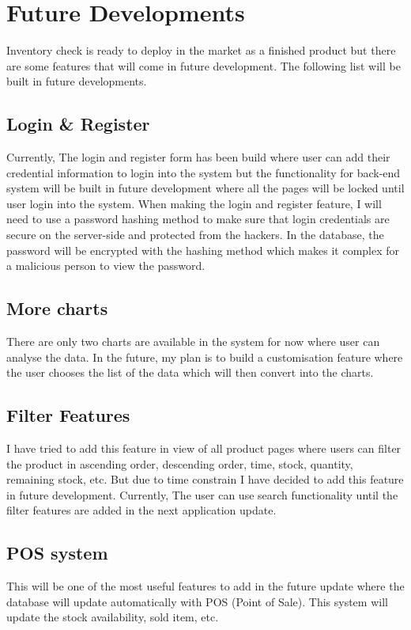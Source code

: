 \section{Future Developments}
Inventory check is ready to deploy in the market as a finished product but there are some features that will come in future development. The following list will be built in future developments.

\subsection{Login \& Register}
Currently, The login and register form has been build where user can add their credential information to login into the system but the functionality for back-end system will be built in future development where all the pages will be locked until user login into the system. When making the login and register feature, I will need to use a password hashing method to make sure that login credentials are secure on the server-side and protected from the hackers. In the database, the password will be encrypted with the hashing method which makes it complex for a malicious person to view the password. 

\subsection{More charts}
There are only two charts are available in the system for now where user can analyse the data. In the future, my plan is to build a customisation feature where the user chooses the list of the data which will then convert into the charts.

\subsection{Filter Features}
I have tried to add this feature in view of all product pages where users can filter the product in ascending order, descending order, time, stock, quantity, remaining stock, etc. But due to time constrain I have decided to add this feature in future development. Currently, The user can use search functionality until the filter features are added in the next application update.

\subsection{POS system}
This will be one of the most useful features to add in the future update where the database will update automatically with POS (Point of Sale). This system will update the stock availability, sold item, etc.

